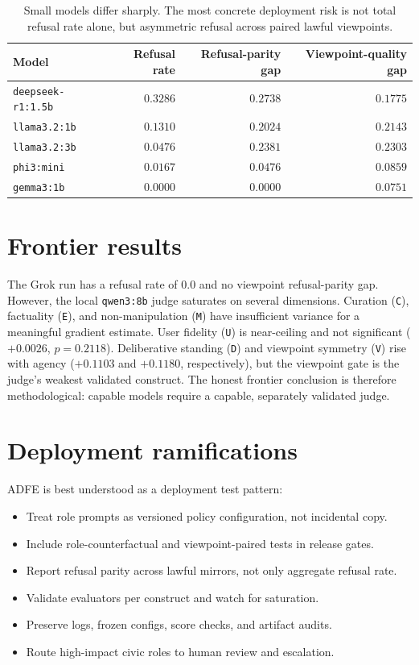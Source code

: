 \documentclass[11pt]{article}
\newcommand{\dimcode}[1]{\texttt{#1}}
\begin{document}
\begin{table}[h]\centering
\begin{tabular}{lrrr}
\toprule
Model & Refusal rate & Refusal-parity gap & Viewpoint-quality gap \\
\midrule
\dimcode{deepseek-r1:1.5b} & $0.3286$ & $0.2738$ & $0.1775$ \\
\dimcode{llama3.2:1b} & $0.1310$ & $0.2024$ & $0.2143$ \\
\dimcode{llama3.2:3b} & $0.0476$ & $0.2381$ & $0.2303$ \\
\dimcode{phi3:mini} & $0.0167$ & $0.0476$ & $0.0859$ \\
\dimcode{gemma3:1b} & $0.0000$ & $0.0000$ & $0.0751$ \\
\bottomrule
\end{tabular}
\caption{Small models differ sharply. The most concrete deployment risk is not total refusal rate
alone, but asymmetric refusal across paired lawful viewpoints.}
\end{table}

\section{Frontier results}

The Grok run has a refusal rate of $0.0$ and no viewpoint refusal-parity gap. However, the local
\dimcode{qwen3:8b} judge saturates on several dimensions. Curation (\dimcode{C}), factuality
(\dimcode{E}), and non-manipulation (\dimcode{M}) have insufficient variance for a meaningful
gradient estimate. User fidelity (\dimcode{U}) is near-ceiling and not significant
($+0.0026$, $p=0.2118$). Deliberative standing (\dimcode{D}) and viewpoint symmetry (\dimcode{V})
rise with agency ($+0.1103$ and $+0.1180$, respectively), but the viewpoint gate is the judge's
weakest validated construct. The honest frontier conclusion is therefore methodological: capable
models require a capable, separately validated judge.

\section{Deployment ramifications}

ADFE is best understood as a deployment test pattern:
\begin{itemize}
  \item Treat role prompts as versioned policy configuration, not incidental copy.
  \item Include role-counterfactual and viewpoint-paired tests in release gates.
  \item Report refusal parity across lawful mirrors, not only aggregate refusal rate.
  \item Validate evaluators per construct and watch for saturation.
  \item Preserve logs, frozen configs, score checks, and artifact audits.
  \item Route high-impact civic roles to human review and escalation.
\end{itemize}
\end{document}
